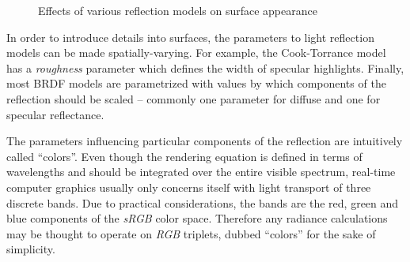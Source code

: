 \begin{figure}[h!]
  \caption{Effects of various reflection models on surface appearance}
  \label{fig:Buddha_reflectionModels}
\end{figure}

In order to introduce details into surfaces, the parameters to light reflection models can be made spatially-varying. For example, the Cook-Torrance model has a \emph{roughness} parameter which defines the width of specular highlights.  Finally, most BRDF models are parametrized with values by which components of the reflection should be scaled -- commonly one parameter for diffuse and one for specular reflectance.

The parameters influencing particular components of the reflection are intuitively called ``colors''. Even though the rendering equation is defined in terms of wavelengths and should be integrated over the entire visible spectrum, real-time computer graphics usually only concerns itself with light transport of three discrete bands. Due to practical considerations, the bands are the red, green and blue components of the \emph{sRGB} color space. Therefore any radiance calculations may be thought to operate on \emph{RGB} triplets, dubbed ``colors'' for the sake of simplicity.

